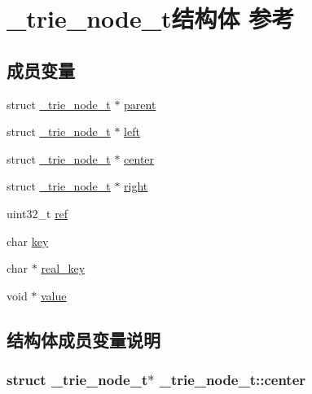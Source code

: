 \hypertarget{a00048}{}\section{\+\_\+trie\+\_\+node\+\_\+t结构体 参考}
\label{a00048}
\subsection*{成员变量}
\begin{DoxyCompactItemize}
\item 
struct \hyperlink{a00048}{\+\_\+trie\+\_\+node\+\_\+t} $\ast$ \hyperlink{a00048_a269a16af8b94efcc7cfe9b3f8ad458a7_a269a16af8b94efcc7cfe9b3f8ad458a7}{parent}
\item 
struct \hyperlink{a00048}{\+\_\+trie\+\_\+node\+\_\+t} $\ast$ \hyperlink{a00048_a19cd065aef056c66d5e8378b0c5e971a_a19cd065aef056c66d5e8378b0c5e971a}{left}
\item 
struct \hyperlink{a00048}{\+\_\+trie\+\_\+node\+\_\+t} $\ast$ \hyperlink{a00048_a1e4c95a35ea575423bfa010712fe9b19_a1e4c95a35ea575423bfa010712fe9b19}{center}
\item 
struct \hyperlink{a00048}{\+\_\+trie\+\_\+node\+\_\+t} $\ast$ \hyperlink{a00048_a7cb2c5153eaaa10e155682239595324d_a7cb2c5153eaaa10e155682239595324d}{right}
\item 
uint32\+\_\+t \hyperlink{a00048_a26621ad6d4899b4e5b15b927c32a7da5_a26621ad6d4899b4e5b15b927c32a7da5}{ref}
\item 
char \hyperlink{a00048_aaa9dc91660187f7dfed1d0f287c9d462_aaa9dc91660187f7dfed1d0f287c9d462}{key}
\item 
char $\ast$ \hyperlink{a00048_aa2491a4ef9d3da21a4695aa7abf2ef02_aa2491a4ef9d3da21a4695aa7abf2ef02}{real\+\_\+key}
\item 
void $\ast$ \hyperlink{a00048_a8c408bd6cb71843d24faf6b77f739c33_a8c408bd6cb71843d24faf6b77f739c33}{value}
\end{DoxyCompactItemize}


\subsection{结构体成员变量说明}
\hypertarget{a00048_a1e4c95a35ea575423bfa010712fe9b19_a1e4c95a35ea575423bfa010712fe9b19}{}
\subsubsection[{center}]{\setlength{\rightskip}{0pt plus 5cm}struct {\bf \+\_\+trie\+\_\+node\+\_\+t}$\ast$ \+\_\+trie\+\_\+node\+\_\+t\+::center}\label{a00048_a1e4c95a35ea575423bfa010712fe9b19_a1e4c95a35ea575423bfa010712fe9b19}
\hypertarget{a00048_aaa9dc91660187f7dfed1d0f287c9d462_aaa9dc91660187f7dfed1d0f287c9d462}{}
